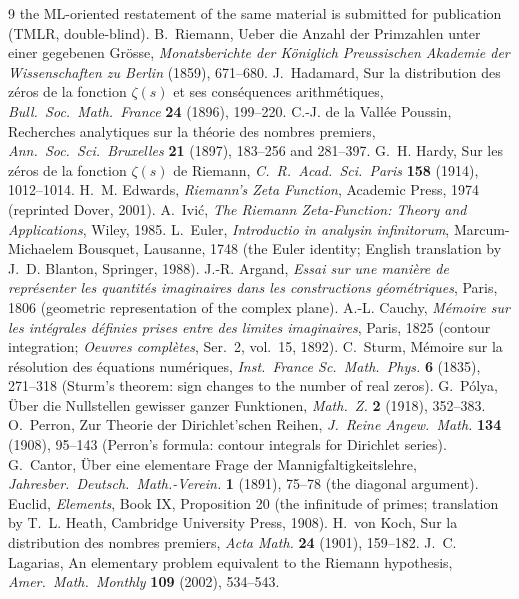 \documentclass{article}
\begin{document}
\begin{thebibliography}{9}
the ML-oriented restatement of the same material is submitted for
publication (TMLR, double-blind).
B.~Riemann, Ueber die Anzahl der Primzahlen unter einer gegebenen
Gr\"osse, \emph{Monatsberichte der K\"oniglich Preussischen Akademie
der Wissenschaften zu Berlin} (1859), 671--680.
J.~Hadamard, Sur la distribution des z\'eros de la fonction
$\zeta(s)$ et ses cons\'equences arithm\'etiques, \emph{Bull.\ Soc.\
Math.\ France} \textbf{24} (1896), 199--220.
C.-J. de la Vall\'ee Poussin, Recherches analytiques sur la th\'eorie
des nombres premiers, \emph{Ann.\ Soc.\ Sci.\ Bruxelles} \textbf{21}
(1897), 183--256 and 281--397.
G.~H. Hardy, Sur les z\'eros de la fonction $\zeta(s)$ de Riemann,
\emph{C.\ R.\ Acad.\ Sci.\ Paris} \textbf{158} (1914), 1012--1014.
\bibitem{edwards1974}
H.~M. Edwards, \emph{Riemann's Zeta Function}, Academic Press, 1974
(reprinted Dover, 2001).
A.~Ivi\'c, \emph{The Riemann Zeta-Function: Theory and Applications},
Wiley, 1985.
L.~Euler, \emph{Introductio in analysin infinitorum}, Marcum-Michaelem
Bousquet, Lausanne, 1748 (the Euler identity; English translation by
J.~D. Blanton, Springer, 1988).
J.-R. Argand, \emph{Essai sur une mani\`ere de repr\'esenter les
quantit\'es imaginaires dans les constructions g\'eom\'etriques},
Paris, 1806 (geometric representation of the complex plane).
A.-L. Cauchy, \emph{M\'emoire sur les int\'egrales d\'efinies prises
entre des limites imaginaires}, Paris, 1825 (contour integration;
\emph{Oeuvres compl\`etes}, Ser.\ 2, vol.\ 15, 1892).
C.~Sturm, M\'emoire sur la r\'esolution des \'equations num\'eriques,
\emph{Inst.\ France Sc.\ Math.\ Phys.} \textbf{6} (1835), 271--318
(Sturm's theorem: sign changes to the number of real zeros).
G.~P\'olya, \"Uber die Nullstellen gewisser ganzer Funktionen,
\emph{Math.\ Z.} \textbf{2} (1918), 352--383.
O.~Perron, Zur Theorie der Dirichlet'schen Reihen,
\emph{J.\ Reine Angew.\ Math.} \textbf{134} (1908), 95--143
(Perron's formula: contour integrals for Dirichlet series).
G.~Cantor, \"Uber eine elementare Frage der Mannigfaltigkeitslehre,
\emph{Jahresber.\ Deutsch.\ Math.-Verein.} \textbf{1} (1891), 75--78
(the diagonal argument).
Euclid, \emph{Elements}, Book IX, Proposition 20 (the infinitude of
primes; translation by T.~L. Heath, Cambridge University Press, 1908).
\bibitem{vonkoch1901}
H.~von Koch, Sur la distribution des nombres premiers,
\emph{Acta Math.} \textbf{24} (1901), 159--182.
J.~C. Lagarias, An elementary problem equivalent to the Riemann
hypothesis, \emph{Amer.\ Math.\ Monthly} \textbf{109} (2002), 534--543.
\end{thebibliography}
\end{document}
